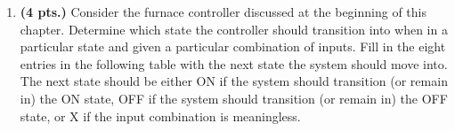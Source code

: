 \begin{enumerate}
\begin{figure}[ht]
        \end{figure}
        \filbreak
    \item \textbf{ (4 pts.)} Consider the furnace
        controller discussed at the beginning of this chapter.  Determine
        which state the controller should transition into when in a particular state
        and given a particular combination of inputs.
        Fill in the eight entries in the following table with the next state
        the system should move into.  The next state should be either ON if the
        system should transition (or remain in) the ON state, OFF if the system
        should transition (or remain in) the OFF state, or X if the input
        combination is meaningless.
        \begin{onlyproblem} %
        \end{onlyproblem}
        \begin{onlysolution}
        \end{onlysolution}


\end{enumerate}
